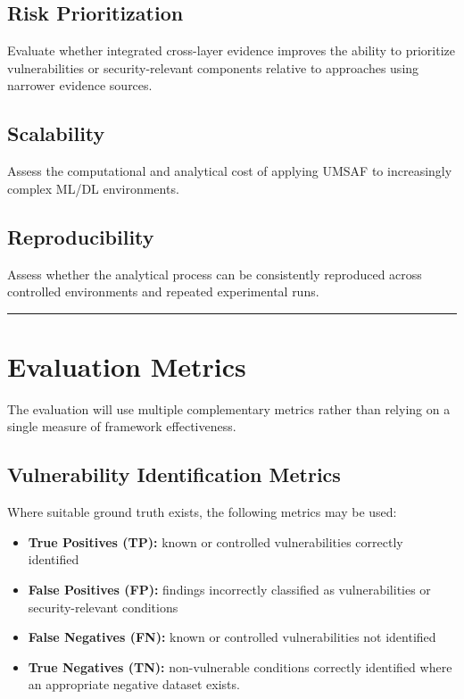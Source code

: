 \documentclass[
  12pt,
  letterpaper,
  oneside]{report}
\providecommand{\tightlist}{%
  \setlength{\itemsep}{0pt}\setlength{\parskip}{0pt}}
\begin{document}
\subsection{Risk Prioritization}\label{1145-risk-prioritization}

Evaluate whether integrated cross-layer evidence improves the ability to
prioritize vulnerabilities or security-relevant components relative to
approaches using narrower evidence sources.

\subsection{Scalability}\label{1146-scalability}

Assess the computational and analytical cost of applying UMSAF to
increasingly complex ML/DL environments.

\subsection{Reproducibility}\label{1147-reproducibility}

Assess whether the analytical process can be consistently reproduced
across controlled environments and repeated experimental runs.

\begin{center}\rule{0.5\linewidth}{0.5pt}\end{center}

\section{Evaluation Metrics}\label{115-evaluation-metrics}

The evaluation will use multiple complementary metrics rather than
relying on a single measure of framework effectiveness.

\subsection{Vulnerability Identification Metrics}\label{1151-vulnerability-identification-metrics}

Where suitable ground truth exists, the following metrics may be used:

\begin{itemize}
\tightlist
\item
  \textbf{True Positives (TP):} known or controlled vulnerabilities
  correctly identified
\item
  \textbf{False Positives (FP):} findings incorrectly classified as
  vulnerabilities or security-relevant conditions
\item
  \textbf{False Negatives (FN):} known or controlled vulnerabilities not
  identified
\item
  \textbf{True Negatives (TN):} non-vulnerable conditions correctly
  identified where an appropriate negative dataset exists.
\end{itemize}
\end{document}
